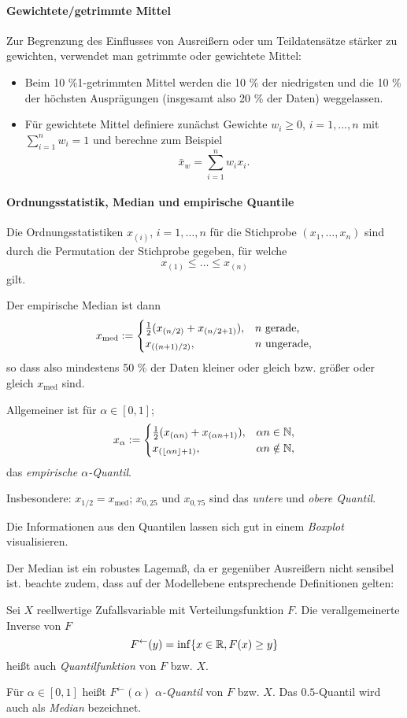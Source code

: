 \paragraph{Gewichtete/getrimmte Mittel}
Zur Begrenzung des Einflusses von Ausreißern oder um Teildatensätze stärker zu
gewichten, verwendet man getrimmte oder gewichtete Mittel:
\begin{itemize}
\item Beim 10 \%1-getrimmten Mittel werden die 10 \% der niedrigsten und die 10
  \% der höchsten Ausprägungen (insgesamt also 20 \% der Daten) weggelassen.
\item Für gewichtete Mittel definiere zunächst Gewichte $w_i \ge 0$, $i = 1,
  \ldots, n$ mit $\sum_{i=1}^n w_i = 1$ und berechne zum Beispiel
  \[ \bar{x}_w = \sum_{i=1}^n w_i x_i. \]
\end{itemize}

\paragraph{Ordnungsstatistik, Median und empirische Quantile}
Die Ordnungsstatistiken $x_{(i)}$, $i = 1, \ldots, n$ für die Stichprobe $(x_1,
\ldots, x_n)$ sind durch die Permutation der Stichprobe gegeben, für welche
\[ x_{(1)} \le \ldots \le x_{(n)} \]
gilt.

Der empirische Median ist dann
\[ x_{\text{med}} := \begin{cases}
    \frac{1}{2} (x_{(n/2)} + x_{(n/2 + 1)}), & n \text{ gerade,} \\
    x_{((n+1)/2)}, & n \text{ ungerade,}
  \end{cases} \]
so dass also mindestens 50 \% der Daten kleiner oder gleich bzw. größer oder
gleich $x_{\text{med}}$ sind.

Allgemeiner ist für $\alpha \in [0,1]$;
\[ x_{\alpha} := \begin{cases}
    \frac{1}{2} (x_{(\alpha n)} + x_{(\alpha n + 1)}), & \alpha n \in \mathbb{N}, \\
    x_{(\lfloor \alpha n \rfloor + 1)}, & \alpha n \notin \mathbb{N},
  \end{cases} \]
das \emph{empirische $\alpha$-Quantil}.

Insbesondere: $x_{1/2} = x_{\text{med}}$; $x_{0,25}$ und $x_{0,75}$ sind das
\emph{untere} und \emph{obere Quantil}.

Die Informationen aus den Quantilen lassen sich gut in einem \emph{Boxplot}
visualisieren.

Der Median ist ein robustes Lagemaß, da er gegenüber Ausreißern nicht sensibel
ist. beachte zudem, dass auf der Modellebene entsprechende Definitionen gelten:
\begin{defn} %
  Sei $X$ reellwertige Zufallsvariable mit Verteilungsfunktion $F$. Die
  verallgemeinerte Inverse von $F$
  \[ F^{\leftarrow}(y) = \inf \{ x \in \mathbb{R}, F(x) \ge y \}\]
  heißt auch \emph{Quantilfunktion} von $F$ bzw. $X$.

  Für $\alpha \in [0,1]$ heißt $F^{\leftarrow}(\alpha)$ \emph{$\alpha$-Quantil}
  von $F$ bzw. $X$. Das $0.5$-Quantil wird auch als \emph{Median} bezeichnet.
\end{defn}

